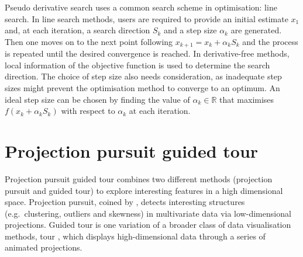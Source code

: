 Pseudo derivative search uses a common search scheme in optimisation:
line search. In line search methods, users are required to provide an
initial estimate \(x_{1}\) and, at each iteration, a search direction
\(S_k\) and a step size \(\alpha_k\) are generated. Then one moves on to
the next point following \(x_{k+1} = x_k + \alpha_kS_k\) and the process
is repeated until the desired convergence is reached. In derivative-free
methods, local information of the objective function is used to
determine the search direction. The choice of step size also needs
consideration, as inadequate step sizes might prevent the optimisation
method to converge to an optimum. An ideal step size can be chosen by
finding the value of \(\alpha_k \in \mathbb{R}\) that maximises
\(f(x_k + \alpha_kS_k)\) with respect to \(\alpha_k\) at each iteration.

\hypertarget{tour}{%
\section{Projection pursuit guided tour}\label{tour}}

Projection pursuit guided tour combines two different methods
(projection pursuit and guided tour) to explore interesting features in
a high dimensional space. Projection pursuit, coined by
\citet{friedman1974projection}, detects interesting structures
(e.g.~clustering, outliers and skewness) in multivariate data via
low-dimensional projections. Guided tour \citep{cook1995grand} is one
variation of a broader class of data visualisation methods, tour
\citep{buja2005computational}, which displays high-dimensional data
through a series of animated projections.

